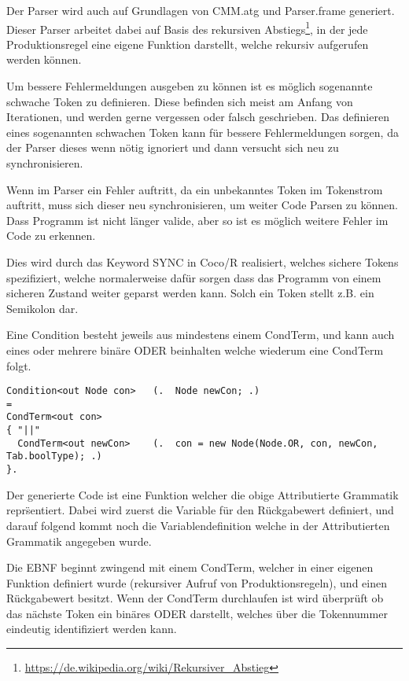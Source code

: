 Der Parser wird auch auf Grundlagen von CMM.atg und Parser.frame generiert. Dieser Parser arbeitet dabei auf Basis des rekursiven Abstiegs\footnote{\url{https://de.wikipedia.org/wiki/Rekursiver_Abstieg}}, in der jede Produktionsregel eine eigene Funktion darstellt, welche rekursiv aufgerufen werden k\"onnen.


Um bessere Fehlermeldungen ausgeben zu k\"onnen ist es m\"oglich sogenannte schwache Token zu definieren. Diese befinden sich meist am Anfang von Iterationen, und werden gerne vergessen oder falsch geschrieben. Das definieren eines sogenannten schwachen Token kann f\"ur bessere Fehlermeldungen sorgen, da der Parser dieses wenn n\"otig ignoriert und dann versucht sich neu zu synchronisieren.


Wenn im Parser ein Fehler auftritt, da ein unbekanntes Token im Tokenstrom auftritt, muss sich dieser neu synchronisieren, um weiter Code Parsen zu k\"onnen. Dass Programm ist nicht l\"anger valide, aber so ist es m\"oglich weitere Fehler im Code zu erkennen.

Dies wird durch das Keyword SYNC in Coco/R realisiert, welches sichere Tokens spezifiziert, welche normalerweise daf\"ur sorgen dass das Programm von einem sicheren Zustand weiter geparst werden kann. Solch ein Token stellt z.B. ein Semikolon dar.


Eine Condition besteht jeweils aus mindestens einem CondTerm, und kann auch eines oder mehrere bin\"are ODER beinhalten welche wiederum eine CondTerm folgt.

\begin{lstlisting}[language=EBNF]
Condition<out Node con>   (.  Node newCon; .)
= 
CondTerm<out con>
{ "||"                                
  CondTerm<out newCon>    (.  con = new Node(Node.OR, con, newCon, Tab.boolType); .)
}.
\end{lstlisting}

Der generierte Code ist eine Funktion welcher die obige Attributierte Grammatik repr\"sentiert. Dabei wird zuerst die Variable f\"ur den R\"uckgabewert definiert, und darauf folgend kommt noch die Variablendefinition welche in der Attributierten Grammatik angegeben wurde.

Die EBNF beginnt zwingend mit einem CondTerm, welcher in einer eigenen Funktion definiert wurde (rekursiver Aufruf von Produktionsregeln), und einen R\"uckgabewert besitzt. Wenn der CondTerm durchlaufen ist wird \"uberpr\"uft ob das n\"achste Token ein bin\"ares ODER darstellt, welches \"uber die Tokennummer eindeutig identifiziert werden kann.

